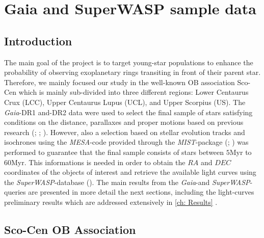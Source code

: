 \chapter{\textbf{Gaia and SuperWASP sample data}}\label{ch: Data}

\section{Introduction}

The main goal of the project is to target young-star populations to enhance the probability of observing exoplanetary rings transiting in front of their parent star. Therefore, we mainly focused our study in the well-known OB association Sco-Cen which is mainly sub-divided into three different regions: Lower Centaurus Crux (LCC), Upper Centaurus Lupus (UCL), and Upper Scorpius (US). The \textit{Gaia}-DR1 and-DR2 data were used to select the final sample of stars satisfying conditions on the distance, parallaxes and proper motions based on previous research (\citeyear{2018MNRAS.tmp..210W}; \citeyear{2016MNRAS.461..794P}; \citeyear{1989A&A...216...44D}). However, also a selection based on stellar evolution tracks and isochrones using the \textit{MESA}-code provided through the \textit{MIST}-package (\citeyear{2016ApJS..222....8D}; \citeyear{2016ApJ...823..102C}) was performed to guarantee that the final sample consists of stars between $5$Myr to $60$Myr. This informations is needed in order to obtain the $RA$ and $DEC$ coordinates of the objects of interest and retrieve the available light curves using the \textit{SuperWASP}-database (\citeyear{2010A&A...520L..10B}). The main results from the \textit{Gaia}-and \textit{SuperWASP}-queries are presented in more detail the next sections, including the light-curves preliminary results which are addressed extensively in \autoref{ch: Results} .   

\section{Sco-Cen OB Association}

